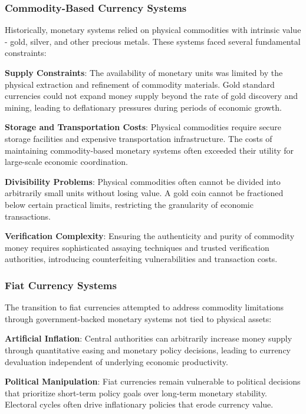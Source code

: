 \documentclass[12pt,a4paper]{article}
\begin{document}
\subsubsection{Commodity-Based Currency Systems}

Historically, monetary systems relied on physical commodities with intrinsic value - gold, silver, and other precious metals. These systems faced several fundamental constraints:

\textbf{Supply Constraints}: The availability of monetary units was limited by the physical extraction and refinement of commodity materials. Gold standard currencies could not expand money supply beyond the rate of gold discovery and mining, leading to deflationary pressures during periods of economic growth.

\textbf{Storage and Transportation Costs}: Physical commodities require secure storage facilities and expensive transportation infrastructure. The costs of maintaining commodity-based monetary systems often exceeded their utility for large-scale economic coordination.

\textbf{Divisibility Problems}: Physical commodities often cannot be divided into arbitrarily small units without losing value. A gold coin cannot be fractioned below certain practical limits, restricting the granularity of economic transactions.

\textbf{Verification Complexity}: Ensuring the authenticity and purity of commodity money requires sophisticated assaying techniques and trusted verification authorities, introducing counterfeiting vulnerabilities and transaction costs.

\subsubsection{Fiat Currency Systems}

The transition to fiat currencies attempted to address commodity limitations through government-backed monetary systems not tied to physical assets:

\textbf{Artificial Inflation}: Central authorities can arbitrarily increase money supply through quantitative easing and monetary policy decisions, leading to currency devaluation independent of underlying economic productivity.

\textbf{Political Manipulation}: Fiat currencies remain vulnerable to political decisions that prioritize short-term policy goals over long-term monetary stability. Electoral cycles often drive inflationary policies that erode currency value.
\end{document}

